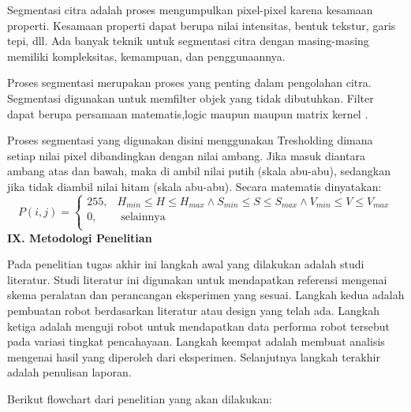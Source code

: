 \documentclass[a4paper,12pt]{article}
\begin{document}
Segmentasi citra adalah proses mengumpulkan pixel-pixel karena kesamaan properti.
Kesamaan properti dapat berupa nilai intensitas, bentuk tekstur, garis tepi, dll.
Ada banyak teknik untuk segmentasi citra dengan masing-masing memiliki kompleksitas, kemampuan, dan penggunaannya.

Proses segmentasi merupakan proses yang penting dalam pengolahan citra.
Segmentasi digunakan untuk memfilter objek yang tidak dibutuhkan.
Filter dapat berupa persamaan matematis,logic maupun maupun matrix kernel \cite{improc1} .

Proses segmentasi yang digunakan disini menggunakan Tresholding dimana setiap nilai pixel dibandingkan dengan nilai ambang.
Jika masuk diantara ambang atas dan bawah, maka di ambil nilai putih (skala abu-abu), sedangkan jika tidak diambil nilai hitam (skala abu-abu).
Secara matematis dinyatakan:
\begin{equation}
  P(i,j) =  
  \begin{cases}
      255,& H_{min} \leq H\leq H_{max} \land S_{min} \leq S\leq S_{max} \land V_{min} \leq V\leq V_{max}\\
      0,              & \text{ selainnya } \\
  \end{cases}
\end{equation}
\newpage
\noindent \textbf{IX. \hspace{9pt} Metodologi Penelitian}

Pada penelitian tugas akhir ini langkah awal yang dilakukan adalah studi literatur.
Studi literatur ini digunakan untuk mendapatkan referensi mengenai skema peralatan dan perancangan eksperimen yang sesuai.
Langkah kedua adalah pembuatan robot berdasarkan literatur atau design yang telah ada.
Langkah ketiga adalah menguji robot untuk mendapatkan data performa robot tersebut pada variasi tingkat pencahayaan.
Langkah keempat adalah membuat analisis mengenai hasil yang diperoleh dari eksperimen. 
Selanjutnya langkah terakhir adalah penulisan laporan.

Berikut flowchart dari penelitian yang akan dilakukan:
\end{document}
